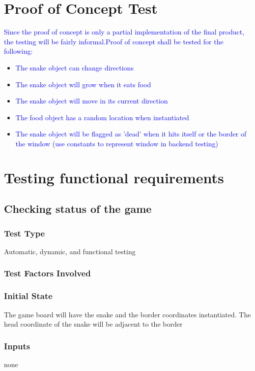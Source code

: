 \documentclass[12pt]{article}
\begin{document}
\section{Proof of Concept Test}
\textcolor{blue}{Since the proof of concept is only a partial implementation of the final product, the testing will be fairly informal.\newline\newline Proof of concept shall be tested for the following:}
\begin{itemize}
\item \textcolor{blue}{The snake object can change directions}
\item \textcolor{blue}{The snake object will grow when it eats food}
\item \textcolor{blue}{The snake object will move in its current direction}
\item \textcolor{blue}{The food object has a random location when instantiated}
\item \textcolor{blue}{The snake object will be flagged as 'dead' when it hits itself or the border of the window (use constants to represent
 window in backend testing)}
\end{itemize}

\section{Testing functional requirements}

\noindent
\subsection{Checking status of the game}
\subsubsection*{Test Type}
Automatic, dynamic, and functional testing
\subsubsection*{Test Factors Involved}
\subsubsection*{Initial State}
The game board will have the snake and the border coordinates instantiated. The head coordinate of the snake will be adjacent to the border 
\subsubsection*{Inputs}
none
\end{document}

